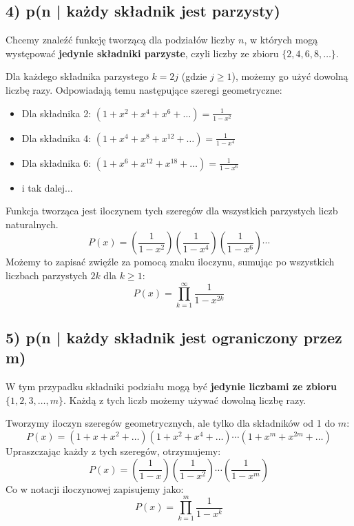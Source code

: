 \documentclass{mwart}
\begin{document}
\begin{mdframed}
    \subsection*{4) p(n | każdy składnik jest parzysty)}
    
    Chcemy znaleźć funkcję tworzącą dla podziałów liczby $n$, w których mogą występować \textbf{jedynie składniki parzyste}, czyli liczby ze zbioru $\{2, 4, 6, 8, \dots\}$.
    
    Dla każdego składnika parzystego $k=2j$ (gdzie $j \ge 1$), możemy go użyć dowolną liczbę razy. Odpowiadają temu następujące szeregi geometryczne:
    \begin{itemize}
        \item Dla składnika 2: $(1 + x^2 + x^4 + x^6 + \dots) = \frac{1}{1-x^2}$
        \item Dla składnika 4: $(1 + x^4 + x^8 + x^{12} + \dots) = \frac{1}{1-x^4}$
        \item Dla składnika 6: $(1 + x^6 + x^{12} + x^{18} + \dots) = \frac{1}{1-x^6}$
        \item i tak dalej...
    \end{itemize}
    
    Funkcja tworząca jest iloczynem tych szeregów dla wszystkich parzystych liczb naturalnych.
    $$ P(x) = \left(\frac{1}{1-x^2}\right) \left(\frac{1}{1-x^4}\right) \left(\frac{1}{1-x^6}\right) \cdots $$
    Możemy to zapisać zwięźle za pomocą znaku iloczynu, sumując po wszystkich liczbach parzystych $2k$ dla $k \ge 1$:
    $$ P(x) = \prod_{k=1}^{\infty} \frac{1}{1-x^{2k}} $$

    \subsection*{5) p(n | każdy składnik jest ograniczony przez m)}

    W tym przypadku składniki podziału mogą być \textbf{jedynie liczbami ze zbioru $\{1, 2, 3, \dots, m\}$}. Każdą z tych liczb możemy używać dowolną liczbę razy.
    
    Tworzymy iloczyn szeregów geometrycznych, ale tylko dla składników od 1 do $m$:
    $$ P(x) = (1+x+x^2+\dots)(1+x^2+x^4+\dots)\cdots(1+x^m+x^{2m}+\dots) $$
    Upraszczając każdy z tych szeregów, otrzymujemy:
    $$ P(x) = \left(\frac{1}{1-x}\right) \left(\frac{1}{1-x^2}\right) \cdots \left(\frac{1}{1-x^m}\right) $$
    Co w notacji iloczynowej zapisujemy jako:
    $$ P(x) = \prod_{k=1}^{m} \frac{1}{1-x^k} $$


\end{mdframed}
\end{document}

